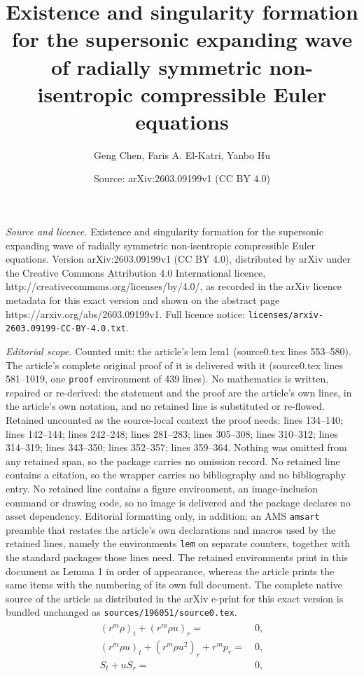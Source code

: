 \documentclass[10pt,a4paper]{amsart}
\title{Existence and singularity formation for the supersonic expanding wave of radially symmetric non-isentropic compressible Euler equations}
\author{Geng Chen, Faris A. El-Katri, Yanbo Hu}
\date{Source: arXiv:2603.09199v1 (CC BY 4.0)}
\begin{document}
\maketitle

\noindent\emph{Source and licence.} Existence and singularity formation for the supersonic expanding wave of radially symmetric non-isentropic compressible Euler equations. Version arXiv:2603.09199v1 (CC BY 4.0), distributed by arXiv under the Creative Commons Attribution 4.0 International licence, http://creativecommons.org/licenses/by/4.0/, as recorded in the arXiv licence metadata for this exact version and shown on the abstract page https://arxiv.org/abs/2603.09199v1. Full licence notice: \texttt{licenses/arxiv-2603.09199-CC-BY-4.0.txt}.\par\smallskip

\noindent\textit{Editorial scope.} Counted unit: the article's lem lem1 (source0.tex lines 553--580). The article's complete original proof of it is delivered with it (source0.tex lines 581--1019, one \texttt{proof} environment of 439 lines). No mathematics is written, repaired or re-derived: the statement and the proof are the article's own lines, in the article's own notation, and no retained line is substituted or re-flowed.  Retained uncounted as the source-local context the proof needs: lines 134--140; lines 142--144; lines 242--248; lines 281--283; lines 305--308; lines 310--312; lines 314--319; lines 343--350; lines 352--357; lines 359--364.  Nothing was omitted from any retained span, so the package carries no omission record.  No retained line contains a citation, so the wrapper carries no bibliography and no bibliography entry.  No retained line contains a figure environment, an image-inclusion command or drawing code, so no image is delivered and the package declares no asset dependency.  Editorial formatting only, in addition: an AMS \texttt{amsart} preamble that restates the article's own declarations and macros used by the retained lines, namely the environments \texttt{lem} on separate counters, together with the standard packages those lines need.  The retained environments print in this document as Lemma 1 in order of appearance, whereas the article prints the same items with the numbering of its own full document.  The complete native source of the article as distributed in the arXiv e-print for this exact version is bundled unchanged as \texttt{sources/196051/source0.tex}.
\begin{align}\label{1.1}
\begin{split}
(r^m\rho)_t+(r^m\rho u)_r=&\ 0, \\
(r^m\rho u)_t+(r^m\rho u^2)_r+ r^m p_r=&\ 0, \\
S_t+uS_r=&\ 0,
\end{split}
\end{align}
\end{document}
